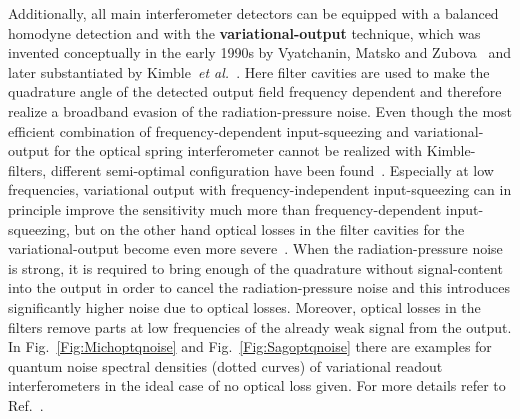 Additionally, all main interferometer detectors can be equipped
with a balanced homodyne detection and with the {\bf
variational-output} technique, which was invented conceptually in
the early 1990s by Vyatchanin, Matsko and
Zubova~\cite{Vyatchanin1993,Vyatchanin1995} and later
substantiated by Kimble~\textit{et al.}~\cite{KLMTV}. Here filter
cavities are used to make the quadrature angle of the detected
output field frequency dependent and therefore realize a broadband
evasion of the radiation-pressure noise. Even though the most
efficient combination of frequency-dependent input-squeezing and
variational-output for the optical spring interferometer cannot be
realized with Kimble-filters, different semi-optimal configuration
have been found~\cite{Buonanno2004}. Especially at low
frequencies, variational output with frequency-independent
input-squeezing can in principle improve the sensitivity much more
than frequency-dependent input-squeezing, but on the other hand
optical losses in the filter cavities for the variational-output
become even more severe~\cite{KLMTV,Chen2010}. When the
radiation-pressure noise is strong, it is required to bring enough
of the quadrature without signal-content into the output in order
to cancel the radiation-pressure noise and this introduces
significantly higher noise due to optical losses. Moreover,
optical losses in the filters remove parts at low
frequencies of the already weak signal from the output. In
Fig.~\ref{Fig:Michoptqnoise} and Fig.~\ref{Fig:Sagoptqnoise} there
are examples for quantum noise spectral densities (dotted curves)
of variational readout interferometers in the ideal case of no
optical loss given. For more details refer to
Ref.~\cite{Mueller-Ebhardt2009}. 